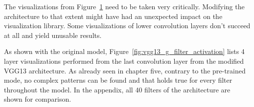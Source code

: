 \begin{figure}[!h]
{}
\label{fig:asbestos_gradcam_g}
\end{figure}

The visualizations from Figure~\ref{fig:asbestos_gradcam_g} need to be taken very critically. Modifying the architecture to that extent might have had an unexpected impact on the visualization library. Some visualizations of lower convolution layers don't succeed at all and yield unusable results.

As shown with the original model, Figure~\ref{fig:vgg13_g_filter_activation} lists 4 layer visualizations performed from the last convolution layer from the modified VGG13 architecture. As already seen in chapter five, contrary to the pre-trained mode, no complex patterns can be found and that holds true for every filter throughout the model. In the appendix, all 40 filters of the architecture are shown for comparison.

